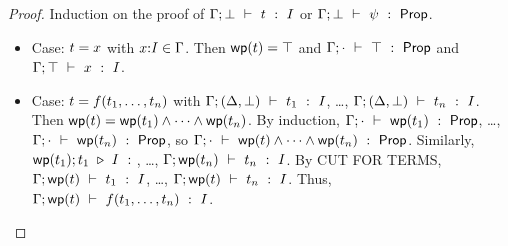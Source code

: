 \documentclass[11pt]{article}
\begin{document}
\begin{proof}
  \raggedright Induction on the proof of
  $\Gamma;\bot\ \vdash\ t\ :\ I$ or $\Gamma;\bot\ \vdash\ \psi\ :\ \mathsf{Prop}$.
  \begin{itemize}
  \item Case: $t = x$ with $x{:}I\in\Gamma$.  Then $\mathop{\mathsf{wp}}(t) = \top$ and
    $\Gamma;\cdot\ \vdash\ \top\ :\ \mathsf{Prop}$ and $\Gamma;\top\ \vdash\ x\ :\ I$.
  \item Case: $t = f({t}_1,\ldots,{t}_{n})$ with
    $\Gamma;(\Delta,\bot)\ \vdash\ t_1\ :\ I$, \ldots,
    $\Gamma;(\Delta,\bot)\ \vdash\ t_n\ :\ I$.  Then $\mathop{\mathsf{wp}}(t) =
    \mathop{\mathsf{wp}}(t_1) \wedge \cdots \wedge \mathop{\mathsf{wp}}(t_n)$.  By induction,
    $\Gamma;\cdot\ \vdash\ \mathop{\mathsf{wp}}(t_1)\ :\ \mathsf{Prop}$, \ldots,
    $\Gamma;\cdot\ \vdash\ \mathop{\mathsf{wp}}(t_n)\ :\ \mathsf{Prop}$, so
    $\Gamma;\cdot\ \vdash\ \mathop{\mathsf{wp}}(t) \wedge \cdots \wedge \mathop{\mathsf{wp}}(t_n)\ :\ \mathsf{Prop}$.
    Similarly, $\wfterm{\wp{\t_1}}{\t_1}{\I}$, \ldots,
    $\Gamma;\mathop{\mathsf{wp}}(t_n)\ \vdash\ t_n\ :\ I$.  By CUT FOR TERMS,
    $\Gamma;\mathop{\mathsf{wp}}(t)\ \vdash\ t_1\ :\ I$, \ldots,
    $\Gamma;\mathop{\mathsf{wp}}(t)\ \vdash\ t_n\ :\ I$.  Thus,
    $\Gamma;\mathop{\mathsf{wp}}(t)\ \vdash\ f({t}_1,\ldots,{t}_{n})\ :\ I$.  \iffalse
  \item Case: $\t = \tDesc{\x}{\I}{\p(\x)}$. Then
    $\wp{\t} = 
       (\pForall{\x}{\I}{\wp{\p(\x)}}) \wedge$
       $(\pExists{\x}{\I}{\p(\x)}) \wedge$
       $(\pForall{\x}{\I}{\pForall{\y}{\I}
               {\pImply{\pAnd{\p(\x)}{\p(\y)}}{\x=\y}}})$.
    By the inductive hypothesis, $\jwfprop{}{\wp{\p(\x)}}$, so 
    by WEAKENING $\jwfprop{\x{:}\I}{\wp{\p(\x)}}$ and hence
    $\jwfprop{}{\pForall{\x}{\I}{\wp{\p(\x)}}}$.
 \fi

  \end{itemize}
\end{proof}
\end{document}
